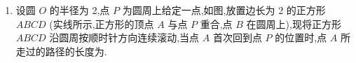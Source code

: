 \begin{enumerate}
\begin{jieda}
\begin{enumerate}
            换元$t = cos^2\theta, t \in (0, 1)$，故$4t^2+1 = \dfrac{1}{t}$，数形结合可以判断关于$t$的方程只有一解，观察可知$t = \dfrac{1}{2}$满足要求，因此$\theta = \dfrac{\pi}{4}$
            
            故$b = 1$，因此$a = \sqrt{2}$
            \item 方法2 \\
            设右焦点(1,0)关于直线 $y = {bx}$的对称点的坐标为 $\left( {{x}_{0},{y}_{0}}\right)$ . 
            
            由题意可得
            $\left\{  {\begin{array}{l} \dfrac{0 + {y}_{0}}{2} = b \cdot  \dfrac{1 + {x}_{0}}{2} \\  \dfrac{{y}_{0}}{{x}_{0} - 1} =  - \dfrac{1}{b} \end{array}\text{,得}\left\{  {\begin{array}{l} {x}_{0} = \dfrac{1 - {b}^{2}}{1 + {b}^{2}} \\  {y}_{0} = \dfrac{2b}{1 + {b}^{2}} \end{array}\text{. 又}\left( {{x}_{0},{y}_{0}}\right)}\right. }\right.$
            在椭圆上, $\therefore \dfrac{{x}_{0}^{2}}{{a}^{2}} + \dfrac{{y}_{0}^{2}}{{b}^{2}} = 1$ ,即 $\dfrac{{\left( \dfrac{1 - {b}^{2}}{1 + {b}^{2}}\right) }^{2}}{{a}^{2}} + \dfrac{{\left( \dfrac{2b}{1 + {b}^{2}}\right) }^{2}}{{b}^{2}} =$
            1. 又 ${a}^{2} = {b}^{2} + {c}^{2} = {b}^{2} + 1$ ,解得 ${a}^{2} = 2$ ,即 $a = \sqrt{2}$ .
        \end{enumerate}
    \end{jieda}
    \item 设圆 $O$ 的半径为 2,点 $P$ 为圆周上给定一点,如图,放置边长为 2 的正方形 ${ABCD}$ (实线所示,正方形的顶点 $A$ 与点 $P$ 重合,点 $B$ 在圆周上),现将正方形 ${ABCD}$ 沿圆周按顺时针方向连续滚动,当点 $A$ 首次回到点 $P$ 的位置时,点 $A$ 所走过的路径的长度为.
    

\end{enumerate}
